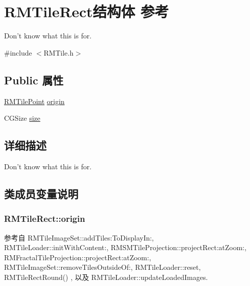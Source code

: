 \hypertarget{struct_r_m_tile_rect}{\section{R\-M\-Tile\-Rect结构体 参考}
\label{struct_r_m_tile_rect}
}


Don't know what this is for.  




{\ttfamily \#include $<$R\-M\-Tile.\-h$>$}

\subsection*{Public 属性}
\begin{DoxyCompactItemize}
\item 
\hyperlink{struct_r_m_tile_point}{R\-M\-Tile\-Point} \hyperlink{struct_r_m_tile_rect_a4a410a53fe46331bba8c7b0431f173ba}{origin}
\item 
C\-G\-Size \hyperlink{struct_r_m_tile_rect_a94e1d6f03e6a83a121c4b577499a925c}{size}
\end{DoxyCompactItemize}


\subsection{详细描述}
Don't know what this is for. 

\subsection{类成员变量说明}
\hypertarget{struct_r_m_tile_rect_a4a410a53fe46331bba8c7b0431f173ba}{
\subsubsection[{origin}]{ R\-M\-Tile\-Rect\-::origin}}\label{struct_r_m_tile_rect_a4a410a53fe46331bba8c7b0431f173ba}


参考自 R\-M\-Tile\-Image\-Set\-::add\-Tiles\-:\-To\-Display\-In\-:, R\-M\-Tile\-Loader\-::init\-With\-Content\-:, R\-M\-S\-M\-Tile\-Projection\-::project\-Rect\-:at\-Zoom\-:, R\-M\-Fractal\-Tile\-Projection\-::project\-Rect\-:at\-Zoom\-:, R\-M\-Tile\-Image\-Set\-::remove\-Tiles\-Outside\-Of\-:, R\-M\-Tile\-Loader\-::reset, R\-M\-Tile\-Rect\-Round() , 以及 R\-M\-Tile\-Loader\-::update\-Loaded\-Images.

